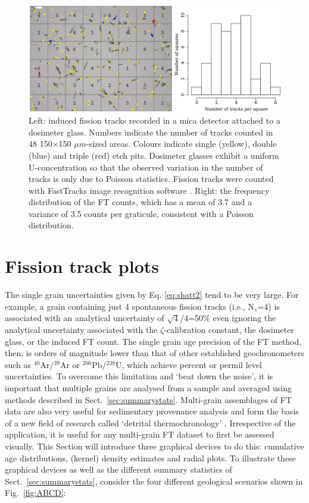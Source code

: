 \documentclass{article}
\begin{document}
\begin{figure}
\centering
\includegraphics[width=\textwidth]{Poisson.png}
\caption{Left: induced fission tracks recorded in a mica detector
  attached to a dosimeter glass. Numbers indicate the number of tracks
  counted in 48 150$\times$150 $\mu m$-sized areas. Colours indicate
  single (yellow), double (blue) and triple (red) etch pits. Dosimeter
  glasses exhibit a uniform U-concentration so that the observed
  variation in the number of tracks is only due to Poisson
  statistics. Fission tracks were counted with FastTracks image
  recognition software \citep[see Chap.~4][]{gleadow2018}. Right: the
  frequency distribution of the FT counts, which has a mean of 3.7 and
  a variance of 3.5 counts per graticule, consistent with a Poisson
  distribution.}
\label{fig:Poisson}
\end{figure}

\section{Fission track plots}
\label{sec:visualisation}

The single grain uncertainties given by Eq. \ref{eq:shatt2} tend to be
very large.  For example, a grain containing just 4 spontaneous
fission tracks (i.e., N$_s$=4) is associated with an analytical
uncertainty of $\sqrt{4}$/4=50\% even ignoring the analytical
uncertainty associated with the $\zeta$-calibration constant, the
dosimeter glass, or the induced FT count.  The single grain age
precision of the FT method, then, is orders of magnitude lower than
that of other established geochronometers such as $^{40}$Ar/$^{39}$Ar
or $^{206}$Pb/$^{238}$U, which achieve percent or permil level
uncertainties. To overcome this limitation and `beat down the noise',
it is important that multiple grains are analysed from a sample and
averaged using methods described in
Sect.~\ref{sec:summarystats}. Multi-grain assemblages of FT data are
also very useful for sedimentary provenance analysis and form the
basis of a new field of research called `detrital thermochronology'
\citep{bernet2018, carter2018}.  Irrespective of the application, it
is useful for any multi-grain FT dataset to first be assessed
visually.  This Section will introduce three graphical devices to do
this: cumulative age distributions, (kernel) density estimates and
radial plots. To illustrate these graphical devices as well as the
different summary statistics of Sect.~\ref{sec:summarystats}, consider
the four different geological scenarios shown in Fig.~\ref{fig:ABCD}:
\end{document}
